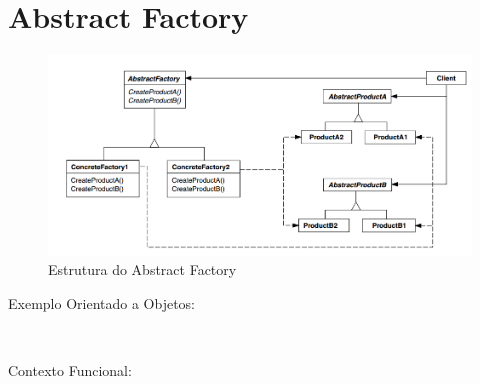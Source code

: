 \section{Abstract Factory}


\begin{figure}[htb]
	\caption{\label{abfactory_struct}Estrutura do Abstract Factory}
	\begin{center}
	    \includegraphics[scale=0.4]{5_padroes-contexto-funcional/5.1_criacionais/5.1.2_abstract-factory/diagram.png}
	\end{center}
\end{figure}

Exemplo Orientado a Objetos:

\begin{lstlisting}[caption={Abstract Factory Orientado a Objetos},label=ooabfactory]
    

\end{lstlisting}

Contexto Funcional:

\begin{lstlisting}[caption={Abstract Factory Funcional},label=fpabfactory]
    
    

\end{lstlisting}